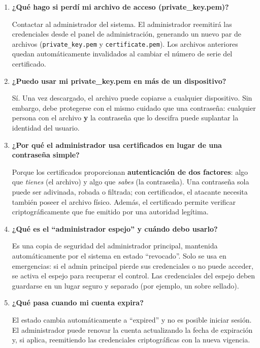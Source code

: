 \documentclass[10pt,letterpaper]{report}
\begin{document}
\begin{enumerate}[leftmargin=1cm, label=\textbf{P\arabic*.}]

  \item \textbf{¿Qué hago si perdí mi archivo de acceso (private\_key.pem)?}

  Contactar al administrador del sistema. El administrador reemitirá las credenciales desde el panel de administración, generando un nuevo par de archivos (\texttt{private\_key.pem} y \texttt{certificate.pem}). Los archivos anteriores quedan automáticamente invalidados al cambiar el número de serie del certificado.

  \item \textbf{¿Puedo usar mi private\_key.pem en más de un dispositivo?}

  Sí. Una vez descargado, el archivo puede copiarse a cualquier dispositivo. Sin embargo, debe protegerse con el mismo cuidado que una contraseña: cualquier persona con el archivo \textbf{y} la contraseña que lo descifra puede suplantar la identidad del usuario.

  \item \textbf{¿Por qué el administrador usa certificados en lugar de una contraseña simple?}

  Porque los certificados proporcionan \textbf{autenticación de dos factores}: algo que \textit{tienes} (el archivo) y algo que \textit{sabes} (la contraseña). Una contraseña sola puede ser adivinada, robada o filtrada; con certificados, el atacante necesita también poseer el archivo físico. Además, el certificado permite verificar criptográficamente que fue emitido por una autoridad legítima.

  \item \textbf{¿Qué es el ``administrador espejo'' y cuándo debo usarlo?}

  Es una copia de seguridad del administrador principal, mantenida automáticamente por el sistema en estado ``revocado''. Solo se usa en emergencias: si el admin principal pierde sus credenciales o no puede acceder, se activa el espejo para recuperar el control. Las credenciales del espejo deben guardarse en un lugar seguro y separado (por ejemplo, un sobre sellado).

  \item \textbf{¿Qué pasa cuando mi cuenta expira?}

  El estado cambia automáticamente a ``expired'' y no es posible iniciar sesión. El administrador puede renovar la cuenta actualizando la fecha de expiración y, si aplica, reemitiendo las credenciales criptográficas con la nueva vigencia.


\end{enumerate}
\end{document}
